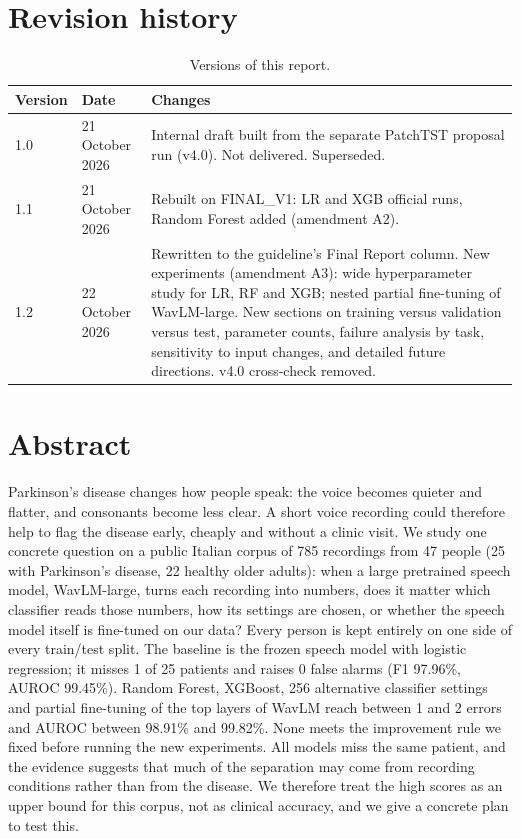 \documentclass[11pt,a4paper]{article}
\begin{document}
\section*{Revision history}
\begin{table}[H]\centering\footnotesize\renewcommand{\arraystretch}{1.15}
\caption{Versions of this report.}
\begin{tabular}{llp{11.4cm}}
\toprule
\textbf{Version} & \textbf{Date} & \textbf{Changes}\\
\midrule
1.0 & 21 October 2026 & Internal draft built from the separate PatchTST proposal run (v4.0). Not delivered. Superseded.\\
1.1 & 21 October 2026 & Rebuilt on FINAL\_V1: LR and XGB official runs, Random Forest added (amendment A2).\\
1.2 & 22 October 2026 & Rewritten to the guideline's Final Report column. New experiments (amendment A3): wide hyperparameter study for LR, RF and XGB; nested partial fine-tuning of WavLM-large. New sections on training versus validation versus test, parameter counts, failure analysis by task, sensitivity to input changes, and detailed future directions. v4.0 cross-check removed.\\
\bottomrule
\end{tabular}\end{table}
\section{Abstract}\label{sec:abstract}
Parkinson's disease changes how people speak: the voice becomes quieter and flatter, and consonants become less clear. A short voice recording could therefore help to flag the disease early, cheaply and without a clinic visit. We study one concrete question on a public Italian corpus of 785 recordings from 47 people (25 with Parkinson's disease, 22 healthy older adults): when a large pretrained speech model, WavLM-large, turns each recording into numbers, does it matter which classifier reads those numbers, how its settings are chosen, or whether the speech model itself is fine-tuned on our data? Every person is kept entirely on one side of every train/test split. The baseline is the frozen speech model with logistic regression; it misses 1 of 25 patients and raises 0 false alarms (F1 97.96\%, AUROC 99.45\%). Random Forest, XGBoost, 256 alternative classifier settings and partial fine-tuning of the top layers of WavLM reach between 1 and 2 errors and AUROC between 98.91\% and 99.82\%. None meets the improvement rule we fixed before running the new experiments. All models miss the same patient, and the evidence suggests that much of the separation may come from recording conditions rather than from the disease. We therefore treat the high scores as an upper bound for this corpus, not as clinical accuracy, and we give a concrete plan to test this.
\end{document}

